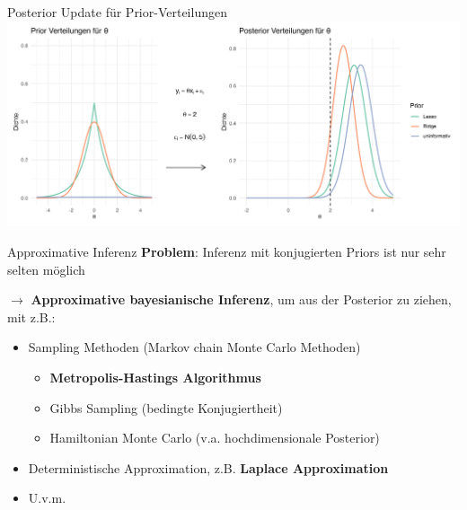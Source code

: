 \documentclass[
  ignorenonframetext,
  aspectratio=169,
]{beamer}
\providecommand{\tightlist}{%
  \setlength{\itemsep}{0pt}\setlength{\parskip}{0pt}}
\begin{document}
\begin{frame}{Posterior Update für Prior-Verteilungen}
\protect{}\label{posterior-update-fuxfcr-prior-verteilungen}
\includegraphics[width=0.9\linewidth,height=\textheight,keepaspectratio]{../figures/plot_update.png}
\end{frame}

\begin{frame}{Approximative Inferenz}
\protect{}\label{approximative-inferenz}
\textbf{Problem}: Inferenz mit konjugierten Priors ist nur sehr selten
möglich \autocite{polson_bayesian_2013}

\(\to\) \textbf{Approximative bayesianische Inferenz}, um aus der
Posterior zu ziehen, mit z.B.:

\begin{itemize}
\tightlist
\item
  Sampling Methoden (Markov chain Monte Carlo Methoden)

  \begin{itemize}
  \tightlist
  \item
    \textbf{Metropolis-Hastings Algorithmus}
    \autocite{hastings_monte_1970}
  \item
    Gibbs Sampling (bedingte Konjugiertheit)
    \autocite{dellaportas_bayesian_1993}
  \item
    Hamiltonian Monte Carlo (v.a. hochdimensionale Posterior)
    \autocite{neal_probabilistic_1993}
  \end{itemize}
\item
  Deterministische Approximation, z.B. \textbf{Laplace Approximation}
  \autocite{tierney_accurate_1986}
\item
  U.v.m.
\end{itemize}
\end{frame}
\end{document}
